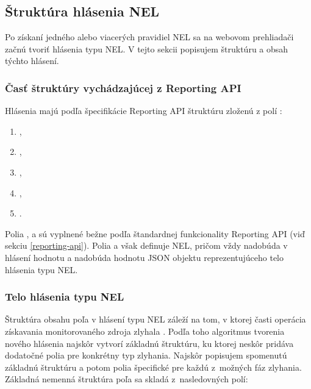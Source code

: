 \subsection{Štruktúra hlásenia NEL}
\label{struktura-hlasenia-nel}

Po získaní jedného alebo viacerých pravidiel NEL sa na webovom prehliadači začnú tvoriť hlásenia typu NEL.
V tejto sekcii popisujem štruktúru a obsah týchto hlásení.

\subsubsection{Časť štruktúry vychádzajúcej z Reporting API}

Hlásenia majú podľa špecifikácie Reporting API štruktúru zloženú z polí \cite{W3C-NEL, W3C-reporting-api}:
\begin{enumerate}
    \item {},
    \item {},
    \item {} ,
    \item {},
    \item {}.
\end{enumerate}

Polia ,  a  sú vyplnené bežne podľa štandardnej funkcionality Reporting API (viď sekciu \ref{reporting-api}).
Polia  a  však definuje NEL, pričom  vždy nadobúda v hlásení hodnotu  a  nadobúda hodnotu JSON objektu reprezentujúceho telo hlásenia typu NEL.

\subsubsection{Telo hlásenia typu NEL}
\label{network-error-logging-spec-type}

Štruktúra obsahu poľa  v hlásení typu NEL záleží na tom, v ktorej časti operácia získavania monitorovaného zdroja zlyhala \cite{W3C-NEL}.
Podľa toho algoritmus tvorenia nového hlásenia najskôr vytvorí základnú štruktúru, ku ktorej neskôr pridáva dodatočné polia pre konkrétny typ zlyhania.
Najskôr popisujem spomenutú základnú štruktúru a potom polia špecifické pre každú \mbox{z možných} fáz zlyhania.
Základná nemenná štruktúra poľa  sa skladá \mbox{z nasledovných} polí:

